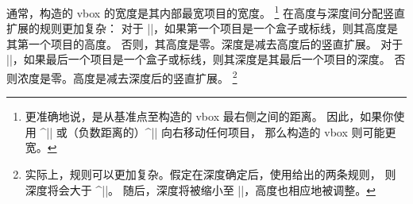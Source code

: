 通常，构造的 vbox 的宽度是其内部最宽项目的宽度。
\footnote{更准确地说，是从基准点至构造的 vbox 最右侧之间的距离。
因此，如果你使用 ^|\moveright| 或（负数距离的）^|\moveleft| 向右移动任何项目，
那么构造的 vbox 则可能更宽。}
在高度与深度间分配竖直扩展的规则更加复杂：
\ulist
\li 对于 |\vtop|，如果第一个项目是一个盒子或标线，则其高度是其第一个项目的高度。
否则，其高度是零。深度是减去高度后的竖直扩展。
\li 对于 |\vbox|，如果最后一个项目是一个盒子或标线，则其深度是其最后一个项目的深度。
否则浓度是零。高度是减去深度后的竖直扩展。
\footnote{实际上，规则可以更加复杂。假定在深度确定后，使用给出的两条规则，
则深度将会大于 ^|\boxmaxdepth|。 随后，深度将被缩小至 |\boxmaxdepth|，高度也相应地被调整。}
\endulist

